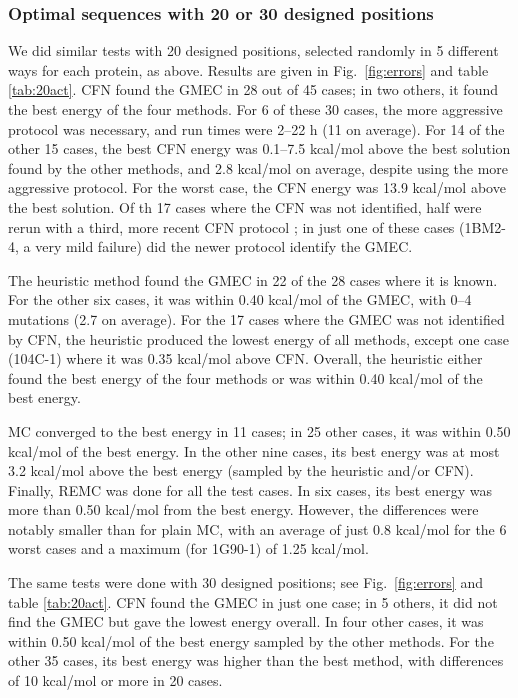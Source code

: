 \subsubsection{Optimal sequences with 20 or 30 designed positions}
We did similar tests with 20 designed positions, selected randomly in 5 different ways for each protein, as above.
Results are given in Fig.\ \ref{fig:errors} and table \ref{tab:20act}. CFN found the GMEC in 28 out of 45 cases;
in two others, it found the best energy of the four methods. For 6 of these 30 cases, the more aggressive protocol was necessary, and run times were 2--22 h (11 on average). For 14 of the other 15 cases, the best CFN energy was 0.1--7.5 kcal/mol above the best solution found by the other methods, and 2.8 kcal/mol on average, despite using the more aggressive protocol. For the worst case, the CFN energy was 13.9 kcal/mol above the best solution. Of th 17 cases where the CFN was not identified, half were rerun with a third, more recent CFN protocol \cite{Simoncini15}; in just one of these cases (1BM2-4, a very mild failure) did the newer protocol identify the GMEC.

The heuristic method found the GMEC in 22 of the 28 cases where it is known. For the other six cases, it was within 0.40 kcal/mol of the GMEC, with 0--4 mutations (2.7 on average). For the 17 cases where the GMEC was not identified by CFN, the heuristic produced the lowest energy of all methods, except one case (104C-1) where it was 0.35 kcal/mol above CFN.
Overall, the heuristic either found the best energy of the four methods or was within 0.40 kcal/mol of the best energy.

MC converged to the best energy in 11 cases; in 25 other cases, it was within 0.50 kcal/mol of the best energy. In the other nine cases, its best energy was at most 3.2 kcal/mol above the best energy (sampled by the heuristic and/or CFN).
Finally, REMC was done for all the test cases. In six cases, its best energy was more than 0.50 kcal/mol from the best energy. However, the differences were notably smaller than for plain MC, with an average of just 0.8 kcal/mol for the 6 worst cases and a maximum (for 1G90-1) of 1.25 kcal/mol.

The same tests were done with 30 designed positions; see Fig.\ \ref{fig:errors} and table \ref{tab:20act}. CFN found the GMEC in just one case; in 5 others, it did not find the GMEC but gave the lowest energy overall. In four other cases, it was within 0.50 kcal/mol of the best energy sampled by the other methods. For the other 35 cases, its best energy was higher than the best method, with differences of 10 kcal/mol or more in 20 cases.


